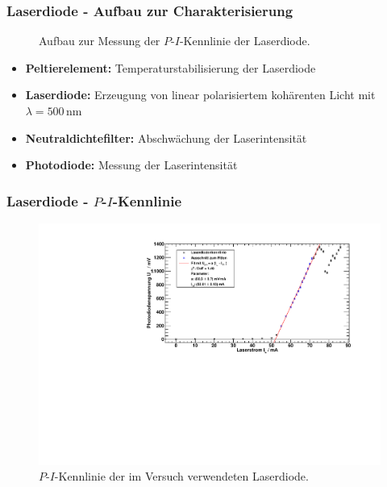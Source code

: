 \begin{frame}
\frametitle{Laserdiode - Aufbau zur Charakterisierung}
\begin{figure}
    \centering
    \def\svgwidth{\textwidth}
    
    \caption{Aufbau zur Messung der $P$-$I$-Kennlinie der Laserdiode.}
\end{figure}
\begin{itemize}
  \item \textbf{Peltierelement:} Temperaturstabilisierung der Laserdiode
  \item \textbf{Laserdiode:} Erzeugung von linear polarisiertem kohärenten Licht mit $\lambda=500$\,nm
  \item \textbf{Neutraldichtefilter:} Abschwächung der Laserintensität
  \item \textbf{Photodiode:} Messung der Laserintensität
\end{itemize}
\end{frame}

\begin{frame}
\frametitle{Laserdiode - $P$-$I$-Kennlinie}

\begin{figure}[H]
    \begin{center}
        \includegraphics[width=\textwidth]{../img/diodenkennlinie.pdf}
        \caption{$P$-$I$-Kennlinie der im Versuch verwendeten Laserdiode.}
    \end{center}
\end{figure}
\end{frame}


